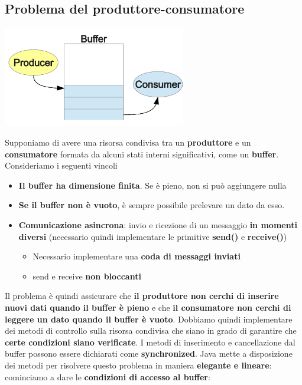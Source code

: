 \documentclass[12pt]{article}
\begin{document}
\subsection{Problema del produttore-consumatore}
\begin{center}
    \includegraphics[width = 0.60\textwidth]{Images/85.PNG}
\end{center}
Supponiamo di avere una risorsa condivisa tra un \textbf{produttore} e un \textbf{consumatore} formata da alcuni stati interni significativi, come un \textbf{buffer}. Consideriamo i seguenti vincoli
\begin{itemize}
    \item \textbf{Il buffer ha dimensione finita}. Se è pieno, non si può aggiungere nulla
    \item \textbf{Se il buffer non è vuoto}, è sempre possibile prelevare un dato da esso.
    \item \textbf{Comunicazione asincrona}: invio e ricezione di un messaggio \textbf{in momenti diversi} (necessario quindi implementare le primitive \textbf{send()} e \textbf{receive()})
          \begin{itemize}
              \item Necessario implementare una \textbf{coda di messaggi inviati}
              \item send e receive \textbf{non bloccanti}
          \end{itemize}
\end{itemize}
Il problema è quindi assicurare che \textbf{il produttore non cerchi di inserire nuovi dati quando il buffer è pieno} e che \textbf{il consumatore non cerchi di leggere un dato quando il buffer è vuoto}. \newline
Dobbiamo quindi implementare dei metodi di controllo sulla risorsa condivisa che siano in grado di garantire che \textbf{certe condizioni siano verificate}. I metodi di inserimento e cancellazione dal buffer possono essere dichiarati come \textbf{synchronized}. Java mette a disposizione dei metodi per risolvere questo problema in maniera \textbf{elegante e lineare}: cominciamo a dare le \textbf{condizioni di accesso al buffer}:
\end{document}
